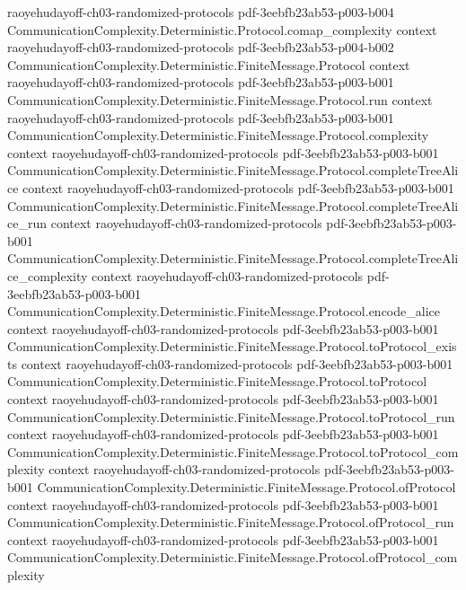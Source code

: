 \begin{theorem}
  {raoyehudayoff-ch03-randomized-protocols}
  {pdf-3eebfb23ab53-p003-b004}
\proofstep
  {CommunicationComplexity.Deterministic.Protocol.comap_complexity}
  {context}
  {raoyehudayoff-ch03-randomized-protocols}
  {pdf-3eebfb23ab53-p004-b002}
\proofstep
  {CommunicationComplexity.Deterministic.FiniteMessage.Protocol}
  {context}
  {raoyehudayoff-ch03-randomized-protocols}
  {pdf-3eebfb23ab53-p003-b001}
\proofstep
  {CommunicationComplexity.Deterministic.FiniteMessage.Protocol.run}
  {context}
  {raoyehudayoff-ch03-randomized-protocols}
  {pdf-3eebfb23ab53-p003-b001}
\proofstep
  {CommunicationComplexity.Deterministic.FiniteMessage.Protocol.complexity}
  {context}
  {raoyehudayoff-ch03-randomized-protocols}
  {pdf-3eebfb23ab53-p003-b001}
\proofstep
  {CommunicationComplexity.Deterministic.FiniteMessage.Protocol.completeTreeAlice}
  {context}
  {raoyehudayoff-ch03-randomized-protocols}
  {pdf-3eebfb23ab53-p003-b001}
\proofstep
  {CommunicationComplexity.Deterministic.FiniteMessage.Protocol.completeTreeAlice_run}
  {context}
  {raoyehudayoff-ch03-randomized-protocols}
  {pdf-3eebfb23ab53-p003-b001}
\proofstep
  {CommunicationComplexity.Deterministic.FiniteMessage.Protocol.completeTreeAlice_complexity}
  {context}
  {raoyehudayoff-ch03-randomized-protocols}
  {pdf-3eebfb23ab53-p003-b001}
\proofstep
  {CommunicationComplexity.Deterministic.FiniteMessage.Protocol.encode_alice}
  {context}
  {raoyehudayoff-ch03-randomized-protocols}
  {pdf-3eebfb23ab53-p003-b001}
\proofstep
  {CommunicationComplexity.Deterministic.FiniteMessage.Protocol.toProtocol_exists}
  {context}
  {raoyehudayoff-ch03-randomized-protocols}
  {pdf-3eebfb23ab53-p003-b001}
\proofstep
  {CommunicationComplexity.Deterministic.FiniteMessage.Protocol.toProtocol}
  {context}
  {raoyehudayoff-ch03-randomized-protocols}
  {pdf-3eebfb23ab53-p003-b001}
\proofstep
  {CommunicationComplexity.Deterministic.FiniteMessage.Protocol.toProtocol_run}
  {context}
  {raoyehudayoff-ch03-randomized-protocols}
  {pdf-3eebfb23ab53-p003-b001}
\proofstep
  {CommunicationComplexity.Deterministic.FiniteMessage.Protocol.toProtocol_complexity}
  {context}
  {raoyehudayoff-ch03-randomized-protocols}
  {pdf-3eebfb23ab53-p003-b001}
\proofstep
  {CommunicationComplexity.Deterministic.FiniteMessage.Protocol.ofProtocol}
  {context}
  {raoyehudayoff-ch03-randomized-protocols}
  {pdf-3eebfb23ab53-p003-b001}
\proofstep
  {CommunicationComplexity.Deterministic.FiniteMessage.Protocol.ofProtocol_run}
  {context}
  {raoyehudayoff-ch03-randomized-protocols}
  {pdf-3eebfb23ab53-p003-b001}
\proofstep
  {CommunicationComplexity.Deterministic.FiniteMessage.Protocol.ofProtocol_complexity}

\end{theorem}
